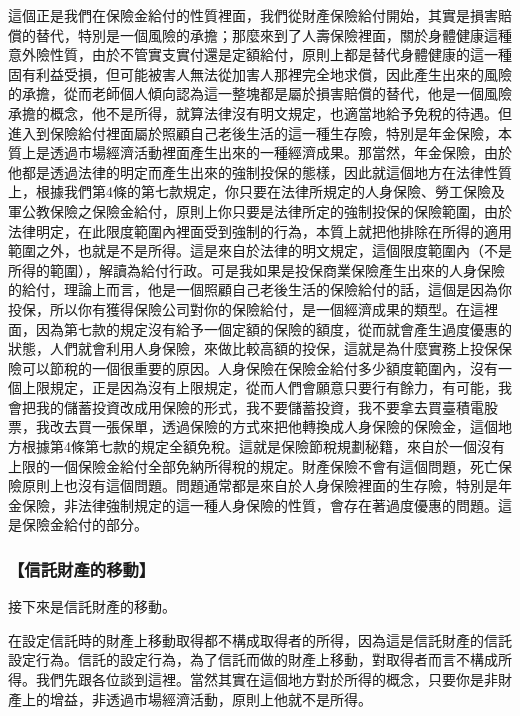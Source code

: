 \documentclass[oneside,sub3section]{ctexbook}
\begin{document}
這個正是我們在保險金給付的性質裡面，我們從財產保險給付開始，其實是損害賠償的替代，特別是一個風險的承擔；那麼來到了人壽保險裡面，關於身體健康這種意外險性質，由於不管實支實付還是定額給付，原則上都是替代身體健康的這一種固有利益受損，但可能被害人無法從加害人那裡完全地求償，因此產生出來的風險的承擔，從而老師個人傾向認為這一整塊都是屬於損害賠償的替代，他是一個風險承擔的概念，他不是所得，就算法律沒有明文規定，也適當地給予免稅的待遇。但進入到保險給付裡面屬於照顧自己老後生活的這一種生存險，特別是年金保險，本質上是透過市場經濟活動裡面產生出來的一種經濟成果。那當然，年金保險，由於他都是透過法律的明定而產生出來的強制投保的態樣，因此就這個地方在法律性質上，根據我們第4條的第七款規定，你只要在法律所規定的人身保險、勞工保險及軍公教保險之保險金給付，原則上你只要是法律所定的強制投保的保險範圍，由於法律明定，在此限度範圍內裡面受到強制的行為，本質上就把他排除在所得的適用範圍之外，也就是不是所得。這是來自於法律的明文規定，這個限度範圍內（不是所得的範圍），解讀為給付行政。可是我如果是投保商業保險產生出來的人身保險的給付，理論上而言，他是一個照顧自己老後生活的保險給付的話，這個是因為你投保，所以你有獲得保險公司對你的保險給付，是一個經濟成果的類型。在這裡面，因為第七款的規定沒有給予一個定額的保險的額度，從而就會產生過度優惠的狀態，人們就會利用人身保險，來做比較高額的投保，這就是為什麼實務上投保保險可以節稅的一個很重要的原因。人身保險在保險金給付多少額度範圍內，沒有一個上限規定，正是因為沒有上限規定，從而人們會願意只要行有餘力，有可能，我會把我的儲蓄投資改成用保險的形式，我不要儲蓄投資，我不要拿去買臺積電股票，我改去買一張保單，透過保險的方式來把他轉換成人身保險的保險金，這個地方根據第4條第七款的規定全額免稅。這就是保險節稅規劃秘籍，來自於一個沒有上限的一個保險金給付全部免納所得稅的規定。財產保險不會有這個問題，死亡保險原則上也沒有這個問題。問題通常都是來自於人身保險裡面的生存險，特別是年金保險，非法律強制規定的這一種人身保險的性質，會存在著過度優惠的問題。這是保險金給付的部分。

\hypertarget{ux4fe1ux8a17ux8ca1ux7522ux7684ux79fbux52d5}{%
\subsubsection{【信託財產的移動】}\label{ux4fe1ux8a17ux8ca1ux7522ux7684ux79fbux52d5}}

接下來是信託財產的移動。

在設定信託時的財產上移動取得都不構成取得者的所得，因為這是信託財產的信託設定行為。信託的設定行為，為了信託而做的財產上移動，對取得者而言不構成所得。我們先跟各位談到這裡。當然其實在這個地方對於所得的概念，只要你是非財產上的增益，非透過市場經濟活動，原則上他就不是所得。
\end{document}
